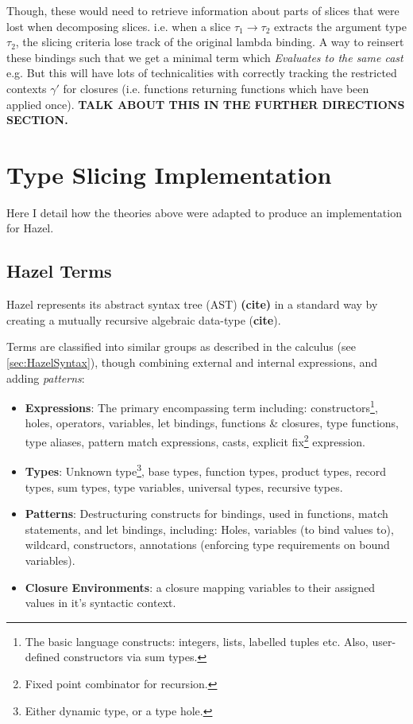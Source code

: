 Though, these would need to retrieve information about parts of slices that were lost when decomposing slices. i.e. when a slice $\tau_1 \to \tau_2$ extracts the argument type $\tau_2$, the slicing criteria lose track of the original lambda binding. A way to reinsert these bindings such that we get a minimal term which \textit{Evaluates to the same cast} e.g. But this will have lots of technicalities with correctly tracking the restricted contexts $\gamma'$ for closures (i.e. functions returning functions which have been applied once). \textbf{TALK ABOUT THIS IN THE FURTHER DIRECTIONS SECTION.}

\section{Type Slicing Implementation}\label{sec:TypeSlicingImplementation}
Here I detail how the theories above were adapted to produce an implementation for Hazel.
\subsection{Hazel Terms}
\label{sec:HazelTerms}
Hazel represents its abstract syntax tree (AST) \textbf{(cite)} in a standard way by creating a mutually recursive algebraic data-type (\textbf{cite}). 

Terms are classified into similar groups as described in the calculus (see \cref{sec:HazelSyntax}), though combining external and internal expressions, and adding \textit{patterns}:
\begin{itemize}
\item \textbf{Expressions}: The primary encompassing term including: constructors\footnote{The basic language constructs: integers, lists, labelled tuples etc. Also, user-defined constructors via sum types.}, holes, operators, variables, let bindings, functions \& closures, type functions, type aliases, pattern match expressions, casts, explicit fix\footnote{Fixed point combinator for recursion.} expression.
\item \textbf{Types}: Unknown type\footnote{Either dynamic type, or a type hole.}, base types, function types, product types, record types, sum types, type variables, universal types, recursive types.
\item \textbf{Patterns}: Destructuring constructs for bindings, used in functions, match statements, and let bindings, including: Holes, variables (to bind values to), wildcard, constructors, annotations (enforcing type requirements on bound variables). 
\item \textbf{Closure Environments}: a closure mapping variables to their assigned values in it's syntactic context.
\end{itemize}

